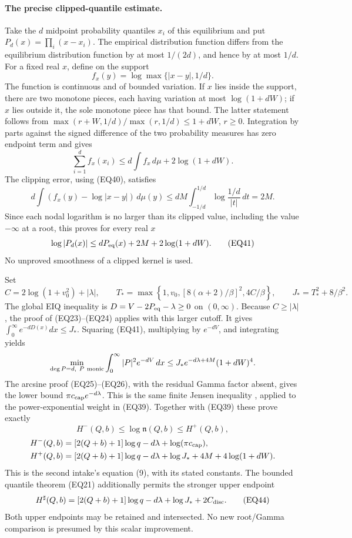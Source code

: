 \documentclass[11pt,a4paper]{article}
\begin{document}
\paragraph{The precise clipped-quantile estimate.}
Take the \(d\) midpoint probability quantiles \(x_i\) of this equilibrium
and put \(P_d(x)=\prod_i(x-x_i)\).  The empirical distribution function
differs from the equilibrium distribution function by at most \(1/(2d)\),
and hence by at most \(1/d\).  For a fixed real \(x\), define on the
support
\[
 f_x(y)=\log\max\{|x-y|,1/d\}.
\]
The function is continuous and of bounded variation.  If \(x\) lies
inside the support, there are two monotone pieces, each having variation
at most \(\log(1+dW)\); if \(x\) lies outside it, the sole monotone
piece has that bound.  The latter statement follows from
\(\max(r+W,1/d)/\max(r,1/d)\le1+dW\), \(r\ge0\).
Integration by parts against the signed difference of the two
probability measures has zero endpoint term and gives
\[
 \sum_{i=1}^d f_x(x_i)\le
 d\int f_x\,d\mu+2\log(1+dW).
\]
The clipping error, using (EQ40), satisfies
\[
 d\int(f_x(y)-\log|x-y|)\,d\mu(y)
 \le dM\int_{-1/d}^{1/d}\log\frac{1/d}{|t|}\,dt=2M.
\]
Since each nodal logarithm is no larger than its clipped value, including
the value \(-\infty\) at a root, this proves for every real \(x\)
\[
 \log|P_d(x)|\le dP_{\rm eq}(x)+2M+2\log(1+dW).
\tag{EQ41}
\]
No unproved smoothness of a clipped kernel is used.

Set
\[
 C=2\log(1+v_0^2)+|\lambda|,\qquad
 T_*=\max\left\{1,v_0,
       [8(\alpha+2)/\beta]^2,4C/\beta\right\},\qquad
 J_*=T_*^2+8/\beta^2.
\tag{EQ42}
\]
The global EIQ inequality is \(D=V-2P_{\rm eq}-\lambda\ge0\) on
\((0,\infty)\).  Because \(C\ge|\lambda|\), the proof of
(EQ23)--(EQ24) applies with this larger cutoff.  It gives
\(\int_0^\infty e^{-dD(x)}dx\le J_*\).
Squaring (EQ41), multiplying by \(e^{-dV}\), and integrating yields
\[
 \min_{\deg P=d,\ P\ {\rm monic}}\int_0^\infty|P|^2e^{-dV}\,dx
 \le J_*e^{-d\lambda+4M}(1+dW)^4.
\]
The arcsine proof (EQ25)--(EQ26), with the residual Gamma factor absent,
gives the lower bound \(\pi c_{\rm cap}e^{-d\lambda}\).
This is the same finite Jensen inequality
\cite[\S12.3, eq.~(12.3.4), pp.~300--301]{human:szego1975},
applied to the power-exponential weight in (EQ39).
Together with (EQ39) these prove exactly
\[
 H^-(Q,b)\le\log{\mathfrak n}(Q,b)\le H^+(Q,b),
\tag{EQ43}
\]
\[
 \begin{split}
 H^-(Q,b)&=[2(Q+b)+1]\log q-d\lambda+\log(\pi c_{\rm cap}),\\
 H^+(Q,b)&=[2(Q+b)+1]\log q-d\lambda
                  +\log J_*+4M+4\log(1+dW).
 \end{split}
\]
This is the second intake's equation (9), with its stated constants.
The bounded quantile theorem (EQ21) additionally permits the stronger
upper endpoint
\[
 H^\sharp(Q,b)=[2(Q+b)+1]\log q-d\lambda+\log J_*+2C_{\rm disc}.
\tag{EQ44}
\]
Both upper endpoints may be retained and intersected.  No new root/Gamma
comparison is presumed by this scalar improvement.
\end{document}
